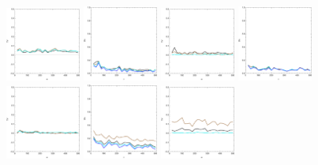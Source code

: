 \documentclass[
twoside,
openright,
titlepage,
numbers=noenddot,
headinclude,%
footinclude=true,
dottedtoc, %
ngerman,
american, %
pagesize=pdftex,
]{book}
\begin{document}
\begin{example}
\begin{figure}[H]
			\includegraphics[width=0.22\textwidth]{figures/1DTVexamples/e2t2}
			\includegraphics[width=0.22\textwidth]{figures/1DTVexamples/e2l1}
			\includegraphics[width=0.22\textwidth]{figures/1DTVexamples/e2l2}
			\includegraphics[width=0.22\textwidth]{figures/1DTVexamples/e2sn1}
			\includegraphics[width=0.22\textwidth]{figures/1DTVexamples/e2sn2}
			\includegraphics[width=0.22\textwidth]{figures/1DTVexamples/e2n+l1}
			\includegraphics[width=0.22\textwidth]{figures/1DTVexamples/e2n+l2}

\end{figure}
\end{example}
\end{document}
